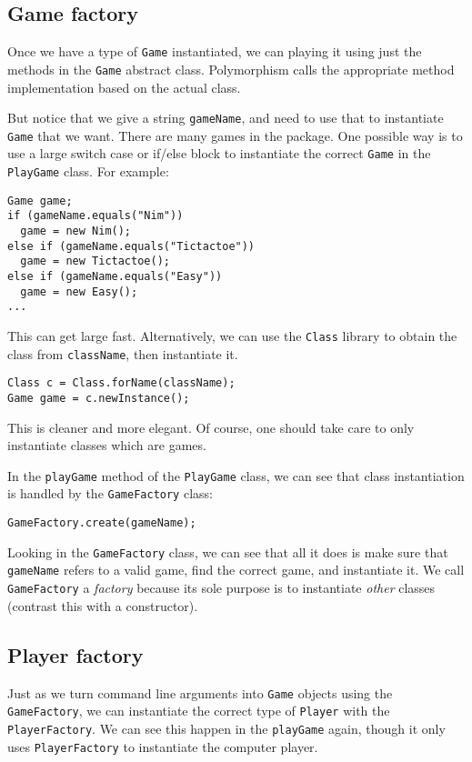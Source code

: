 \documentclass{article}
\begin{document}
\subsection{Game factory}
Once we have a type of \texttt{Game} instantiated, we can playing it using just the methods in the \texttt{Game} abstract class.  Polymorphism calls the appropriate method implementation based on the actual class.

But notice that we give a string \texttt{gameName}, and need to use that to instantiate \texttt{Game} that we want.  There are many games in the package.  One possible way is to use a large switch case or if/else block to instantiate the correct \texttt{Game} in the \texttt{PlayGame} class.  For example:
\begin{verbatim}
Game game;
if (gameName.equals("Nim"))
  game = new Nim();
else if (gameName.equals("Tictactoe"))
  game = new Tictactoe();
else if (gameName.equals("Easy"))
  game = new Easy();
...  
\end{verbatim}

This can get large fast.  Alternatively, we can use the \texttt{Class} library to obtain the class from \texttt{className}, then instantiate it.
\begin{verbatim}
Class c = Class.forName(className);
Game game = c.newInstance();
\end{verbatim}
This is cleaner and more elegant.  Of course, one should take care to only instantiate classes which are games.  

In the \texttt{playGame} method of the \texttt{PlayGame} class, we can see that class instantiation is handled by the \texttt{GameFactory} class:
\begin{verbatim}
GameFactory.create(gameName);
\end{verbatim}

Looking in the \texttt{GameFactory} class, we can see that all it does is make sure that \texttt{gameName} refers to a valid game, find the correct game, and instantiate it.  We call \texttt{GameFactory} a \textit{factory} because its sole purpose is to instantiate \textit{other} classes (contrast this with a constructor).

\subsection{Player factory}
Just as we turn command line arguments into \texttt{Game} objects using the \texttt{GameFactory}, we can instantiate the correct type of \texttt{Player} with the \texttt{PlayerFactory}.  We can see this happen in the \texttt{playGame} again, though it only uses \texttt{PlayerFactory} to instantiate the computer player.
\end{document}
